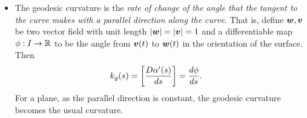 \documentclass[11pt]{article}
\begin{document}
\begin{itemize}
\item \begin{remark}
The geodesic curvature is the \emph{rate of change of the angle that the tangent to the curve makes with a parallel direction along the curve}. That is, define $\boldsymbol{w}, \boldsymbol{v}$ be two vector field with unit length $\left\lvert \boldsymbol{w} \right\rvert = \left\lvert \boldsymbol{v} \right\rvert = 1$ and a differentiable map $\phi: I \rightarrow {\mathbb R}$ to be the angle from $\boldsymbol{v}(t)$ to $\boldsymbol{w}(t)$ in the orientation of the surface. Then 
\begin{align*}
k_{g}(s) &= \left[\frac{D\alpha'(s)}{ds}\right] = \frac{d\phi}{ds}.
\end{align*}
For a plane, as the parallel direction is constant, the geodesic curvature becomes the usual curvature. 
\end{remark}
\end{itemize}
\end{document}

